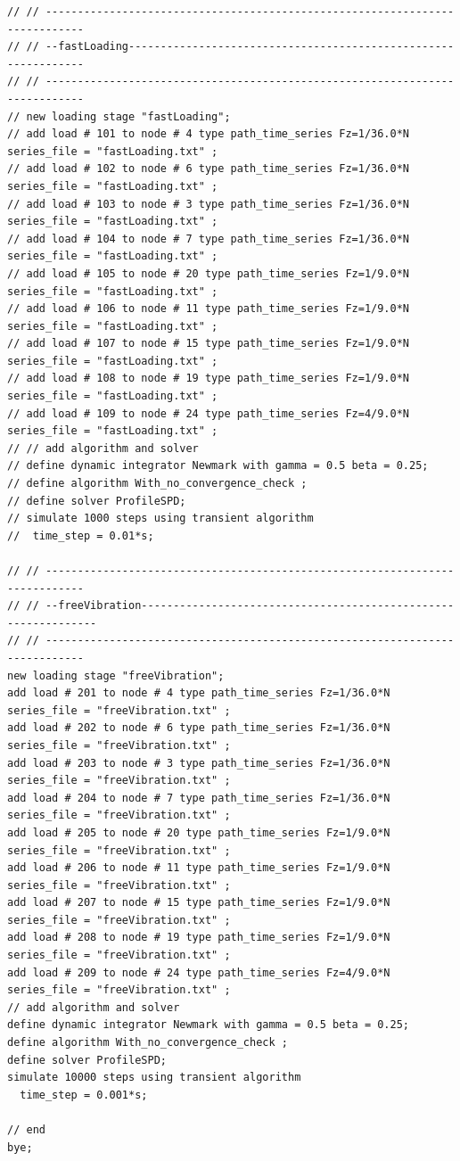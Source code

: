 \begin{lstlisting}
// // ----------------------------------------------------------------------------
// // --fastLoading---------------------------------------------------------------
// // ----------------------------------------------------------------------------
// new loading stage "fastLoading";
// add load # 101 to node # 4 type path_time_series Fz=1/36.0*N series_file = "fastLoading.txt" ; 
// add load # 102 to node # 6 type path_time_series Fz=1/36.0*N series_file = "fastLoading.txt" ; 
// add load # 103 to node # 3 type path_time_series Fz=1/36.0*N series_file = "fastLoading.txt" ; 
// add load # 104 to node # 7 type path_time_series Fz=1/36.0*N series_file = "fastLoading.txt" ; 
// add load # 105 to node # 20 type path_time_series Fz=1/9.0*N series_file = "fastLoading.txt" ; 
// add load # 106 to node # 11 type path_time_series Fz=1/9.0*N series_file = "fastLoading.txt" ; 
// add load # 107 to node # 15 type path_time_series Fz=1/9.0*N series_file = "fastLoading.txt" ; 
// add load # 108 to node # 19 type path_time_series Fz=1/9.0*N series_file = "fastLoading.txt" ; 
// add load # 109 to node # 24 type path_time_series Fz=4/9.0*N series_file = "fastLoading.txt" ; 
// // add algorithm and solver
// define dynamic integrator Newmark with gamma = 0.5 beta = 0.25;
// define algorithm With_no_convergence_check ;
// define solver ProfileSPD;
// simulate 1000 steps using transient algorithm 
//  time_step = 0.01*s;

// // ----------------------------------------------------------------------------
// // --freeVibration---------------------------------------------------------------
// // ----------------------------------------------------------------------------
new loading stage "freeVibration";
add load # 201 to node # 4 type path_time_series Fz=1/36.0*N series_file = "freeVibration.txt" ; 
add load # 202 to node # 6 type path_time_series Fz=1/36.0*N series_file = "freeVibration.txt" ; 
add load # 203 to node # 3 type path_time_series Fz=1/36.0*N series_file = "freeVibration.txt" ; 
add load # 204 to node # 7 type path_time_series Fz=1/36.0*N series_file = "freeVibration.txt" ; 
add load # 205 to node # 20 type path_time_series Fz=1/9.0*N series_file = "freeVibration.txt" ; 
add load # 206 to node # 11 type path_time_series Fz=1/9.0*N series_file = "freeVibration.txt" ; 
add load # 207 to node # 15 type path_time_series Fz=1/9.0*N series_file = "freeVibration.txt" ; 
add load # 208 to node # 19 type path_time_series Fz=1/9.0*N series_file = "freeVibration.txt" ; 
add load # 209 to node # 24 type path_time_series Fz=4/9.0*N series_file = "freeVibration.txt" ; 
// add algorithm and solver
define dynamic integrator Newmark with gamma = 0.5 beta = 0.25;
define algorithm With_no_convergence_check ;
define solver ProfileSPD;
simulate 10000 steps using transient algorithm 
  time_step = 0.001*s;

// end
bye;
\end{lstlisting}

